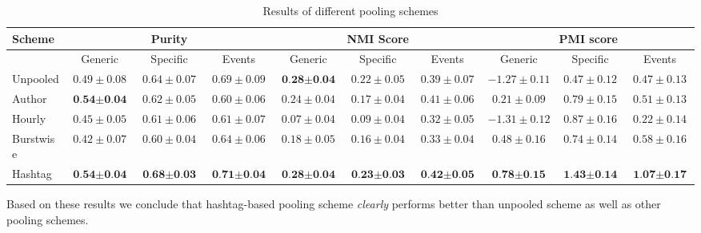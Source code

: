 \documentclass{sig-alternate}
\begin{document}
\begin{table*}[t!]
\centering
\caption{Results of different pooling schemes}\label{tbl-456}
\resizebox{18cm}{!} 
{
	\begin{tabular}{|l|ccc|ccc|ccc|}
	\hline
	Scheme  & \multicolumn {3}{c|}{Purity} & \multicolumn {3}{c|}{NMI Score} & \multicolumn {3}{c|}{PMI score} \\
	\hline
	 & Generic & Specific & Events &  Generic & Specific & Events &  Generic & Specific & Events \\
	\hline
	Unpooled & $ 0.49\pm 0.08 $ & $ 0.64\pm 0.07 $ & $ 0.69\pm 0.09 $ & $ \textbf{0.28} \pm \textbf{0.04} $ & $ 0.22\pm 0.05 $ & $ 0.39\pm 0.07 $ & $ -1.27\pm 0.11 $ & $ 0.47\pm 0.12 $ & $ 0.47\pm 0.13 $\\
	\hline
	Author & $ \textbf{0.54} \pm \textbf{0.04} $ & $ 0.62\pm 0.05 $ & $ 0.60\pm 0.06 $ & $ 0.24\pm 0.04 $ & $ 0.17\pm 0.04 $ & $ 0.41\pm 0.06 $ & $ 0.21\pm 0.09 $ & $ 0.79\pm 0.15 $ & $ 0.51\pm 0.13 $\\
	\hline
	Hourly & $ 0.45\pm 0.05 $ & $ 0.61\pm 0.06 $ & $ 0.61\pm 0.07 $ & $ 0.07\pm 0.04 $ & $ 0.09\pm 0.04 $ & $ 0.32\pm 0.05 $ & $ -1.31\pm 0.12 $ & $ 0.87\pm 0.16 $ & $ 0.22\pm 0.14 $\\
	\hline
	Burstwise & $ 0.42\pm 0.07 $ & $ 0.60\pm 0.04 $ & $ 0.64\pm 0.06 $ & $ 0.18\pm 0.05 $ & $ 0.16\pm 0.04 $ & $ 0.33\pm 0.04 $ & $ 0.48\pm 0.16 $ & $ 0.74\pm 0.14 $ & $ 0.58\pm 0.16 $\\
	\hline
	Hashtag & $ \textbf{0.54}\pm \textbf{0.04} $ & $ \textbf{0.68}\pm \textbf{0.03} $ & $ \textbf{0.71}\pm \textbf{0.04} $ & $ \textbf{0.28}\pm \textbf{0.04} $ & $ \textbf{0.23}\pm \textbf{0.03} $ & $ \textbf{0.42}\pm \textbf{0.05} $ & $ \textbf{0.78}\pm \textbf{0.15} $ & $ \textbf{1.43}\pm  \textbf{0.14} $ & $ \textbf{1.07}\pm\textbf{0.17} $\\
	\hline
	\end{tabular}
}
\end{table*}

Based on these results we conclude that hashtag-based pooling scheme
\emph{clearly} performs better than unpooled scheme as well as other
pooling schemes.

\begin{comment}
An obvious question to ask is: Can we do better? In
the next section we look into hashtag-based pooling in detail and
devise methods which further improve the results and provide better
topics.  We did not evaluate the held-out probability in later
experiments as it agreed generally with the other scores,
and is not as appropriate  as a quality metric for the
undirected information task.
\end{comment}
\end{document}
